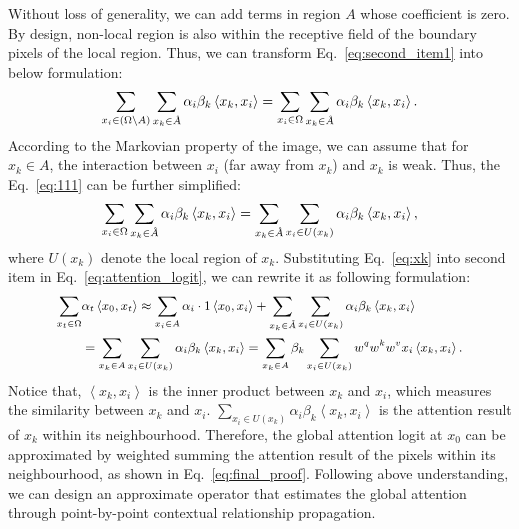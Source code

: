 \documentclass{article}
\begin{document}
Without loss of generality, we can add terms in region $A$ whose coefficient is zero.
By design, non-local region is also within the receptive field of the boundary pixels of the local region.
Thus, we can transform Eq.~\ref{eq:second_item1} into below formulation:
\begin{equation}
\small
   \sum_{x_i\in (\Omega\setminus A)} \sum_{x_k \in \mathring{A}}\alpha_i \beta_k \left\langle x_k,x_i\right\rangle =  \sum_{x_i\in \Omega}\sum_{x_k \in \mathring{A}} \alpha_i \beta_k \left\langle x_k,x_i\right\rangle.
   \label{eq:111}
\end{equation}
According to the Markovian property of the image, we can assume that for $x_k\in A$, the interaction between $x_i$ (far away from $x_k$) and $x_k$ is weak.
Thus, the Eq.~\ref{eq:111} can be further simplified:
\begin{equation}
\small
 \sum_{x_i\in \Omega} \sum_{x_k \in \mathring{A}}\alpha_i \beta_k \left\langle x_k,x_i\right\rangle=
\sum_{x_k\in \mathring{A}}\sum_{x_i\in U(x_k)}\alpha_i \beta_k \left\langle x_k,x_i\right\rangle,
 \label{eq:xk}
\end{equation}
where $U(x_k)$ denote the local region of $x_k$.
Substituting Eq.~\ref{eq:xk} into second item in Eq.~\ref{eq:attention_logit}, we can rewrite it as following formulation:
\begin{equation}
\small
\begin{split}
\sum_{x_t \in \Omega} &\alpha_{t}  \left  \langle x_0,x_t\right\rangle 
\approx \sum_{x_i\in A} \alpha_i \cdot 1  \left\langle x_0,x_i\right\rangle + \sum_{x_k\in \mathring{A}}\sum_{x_i\in U(x_k)}\alpha_i \beta_k \left\langle x_k,x_i\right\rangle \\
&= \sum_{x_k\in A}\sum_{x_i\in U(x_k)} \alpha_i \beta_k \left\langle x_k,x_i\right\rangle
= \sum_{x_k\in A}  \beta_k \sum_{x_i\in U(x_k)} w^qw^kw^v x_i\left\langle x_k,x_i\right\rangle.
\label{eq:final_proof}
\end{split}
\end{equation}
Notice that, {\small$\left\langle x_k,x_i\right\rangle$} is the inner product between {\small$x_k$} and {\small$x_i$}, which  measures the similarity between {\small$x_k$} and {\small$x_i$}.
{\small$\sum_{x_i\in U(x_k)} \alpha_i \beta_k\left\langle x_k,x_i\right\rangle$} is the attention result of $x_k$ within its neighbourhood.
Therefore, the global attention logit at $x_0$ can be approximated by weighted summing the attention result of the pixels within its neighbourhood, as shown in Eq.~\ref{eq:final_proof}.
Following above understanding, we can design an approximate operator that estimates the global attention through point-by-point contextual relationship propagation.
\end{document}
